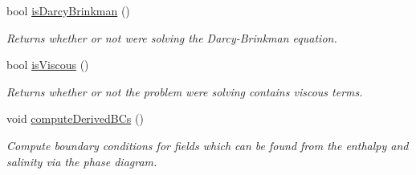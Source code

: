 \begin{DoxyCompactItemize}
\mbox{\label{class_mushy_layer_params_a21363037824da89e96f9cef4989c6b8c}} 
bool \hyperlink{class_mushy_layer_params_a21363037824da89e96f9cef4989c6b8c}{is\+Darcy\+Brinkman} ()
\begin{DoxyCompactList}\small\item\em Returns whether or not we\textquotesingle{}re solving the Darcy-\/\+Brinkman equation. \end{DoxyCompactList}\item 
\mbox{\label{class_mushy_layer_params_a3e940f4b1941f65b43b2eb8a18cccfe9}} 
bool \hyperlink{class_mushy_layer_params_a3e940f4b1941f65b43b2eb8a18cccfe9}{is\+Viscous} ()
\begin{DoxyCompactList}\small\item\em Returns whether or not the problem we\textquotesingle{}re solving contains viscous terms. \end{DoxyCompactList}\item 
\mbox{\label{class_mushy_layer_params_a1a8bb3a4632fdefb7aeaa72d761b56b9}} 
void \hyperlink{class_mushy_layer_params_a1a8bb3a4632fdefb7aeaa72d761b56b9}{compute\+Derived\+B\+Cs} ()
\begin{DoxyCompactList}\small\item\em Compute boundary conditions for fields which can be found from the enthalpy and salinity via the phase diagram. \end{DoxyCompactList}\end{DoxyCompactItemize}
